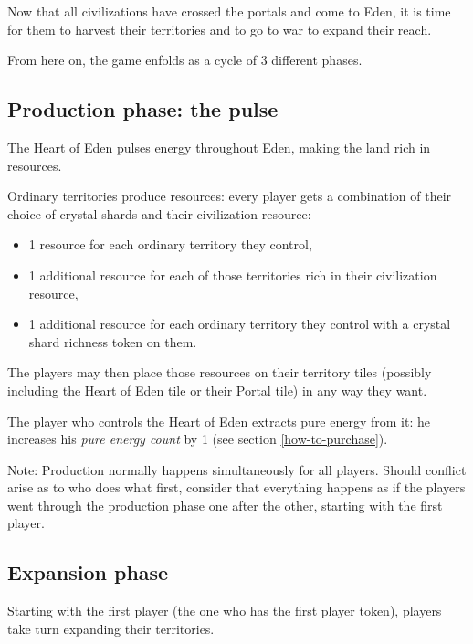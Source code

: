 \documentclass[a4paper]{article}
\begin{document}
    Now that all civilizations have crossed the portals and come to Eden,
    it is time for them to harvest their territories and to go to war to expand
    their reach.
    
    From here on, the game enfolds as a cycle of 3 different phases.
    
    \subsection{Production phase: the pulse}
        \label{prod}
        The Heart of Eden pulses energy throughout Eden,
        making the land rich in resources.
        
        Ordinary territories produce resources:
        every player gets a combination of their choice of crystal shards
        and their civilization resource:
        \vspace{-1.3em}
        \begin{itemize}
            \item 1 resource for each ordinary territory they control,
            \item 1 additional resource for each of those territories
                rich in their civilization resource,
            \item 1 additional resource for each ordinary territory they control
                with a crystal shard richness token on them.
        \end{itemize}
        
        The players may then place those resources on their territory tiles
        (possibly including the Heart of Eden tile or their Portal tile)
        in any way they want.
        
        The player who controls the Heart of Eden extracts pure energy from it:
        he increases his \textit{pure energy count} by 1
        (see section \ref{how-to-purchase}).
        
        Note: Production normally happens simultaneously for all players.
        Should conflict arise as to who does what first,
        consider that everything happens as if the players went through
        the production phase one after the other, starting with the first player.

\newpage
    \subsection{Expansion phase}
        \label{expansion}    
        Starting with the first player (the one who has the first player token),
        players take turn expanding their territories.
        
\end{document}
